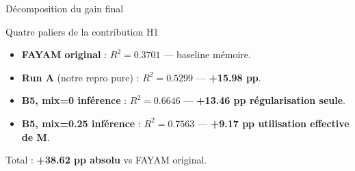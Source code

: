 \documentclass[10pt]{beamer}
\begin{document}
\begin{frame}{Décomposition du gain final}
  \vspace{-6pt}
  \begin{exampleblock}{Quatre paliers de la contribution H1}
    \footnotesize
    \begin{itemize}
      \item \textcolor{fayam}{\textbf{FAYAM original}} : $R^2 = 0.3701$ --- baseline mémoire.
      \item \textcolor{shap}{\textbf{Run A}} (notre repro pure) : $R^2 = 0.5299$ --- \textbf{+15.98 pp}.
      \item \textcolor{cam}{\textbf{B5, mix=0 inférence}} : $R^2 = 0.6646$ --- \textbf{+13.46 pp régularisation seule}.
      \item \textcolor{softcam}{\textbf{B5, mix=0.25 inférence}} : $\boxed{R^2 = 0.7563}$ --- \textbf{+9.17 pp utilisation effective de M}.
    \end{itemize}
  \end{exampleblock}

	\vspace{-6pt}
  \begin{verdictbox}
    \centering
    Total : \textbf{+38.62 pp absolu} vs FAYAM original.
  \end{verdictbox}
\end{frame}
\end{document}
